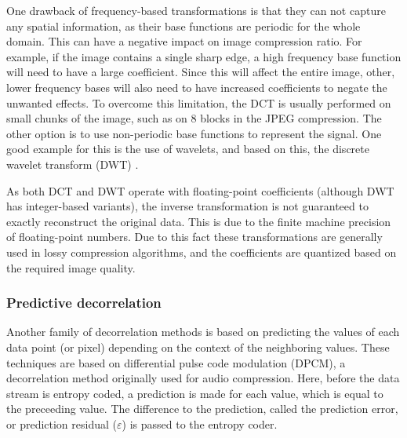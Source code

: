       One drawback of frequency-based transformations is that they can not capture any spatial information, as their base functions are periodic for the whole domain. This can have a negative impact on image compression ratio. For example, if the image contains a single sharp edge, a high frequency base function will need to have a large coefficient. Since this will affect the entire image, other, lower frequency bases will also need to have increased coefficients to negate the unwanted effects.
      To overcome this limitation, the DCT is usually performed on small chunks of the image, such as on 8 blocks in the JPEG compression. The other option is to use non-periodic base functions to represent the signal. One good example for this is the use of wavelets, and based on this, the discrete wavelet transform (DWT) \cite{mallat_theory_1989, jensen_ripples_2001}.

      As both DCT and DWT operate with floating-point coefficients (although DWT has integer-based variants), the inverse transformation is not guaranteed to exactly reconstruct the original data. This is due to the finite machine precision of floating-point numbers. Due to this fact these transformations are generally used in lossy compression algorithms, and the coefficients are quantized based on the required image quality.
      
      
  
      \subsubsection{Predictive decorrelation}
      \label{sec:predictors}
      Another family of decorrelation methods is based on predicting the values of each data point (or pixel) depending on the context of the neighboring values. These techniques are based on differential pulse code modulation (DPCM), a decorrelation method originally used for audio compression. Here, before the data stream is entropy coded, a prediction is made for each value, which is equal to the preceeding value. The difference to the prediction, called the prediction error, or prediction residual ($\varepsilon$) is passed to the entropy coder.

